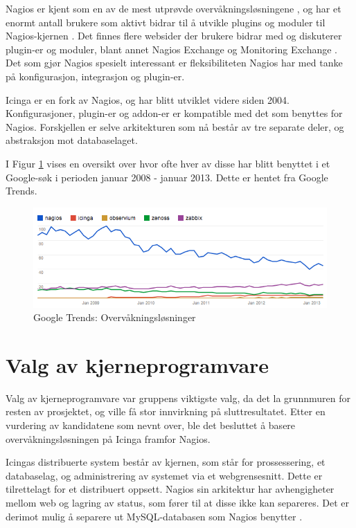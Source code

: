 Nagios er kjent som en av de mest utprøvde overvåkningsløsningene \cite{wiki:nagios} \cite{monitoringsetup} \cite{opensourcewatch} \cite{sectools}, og har et enormt antall brukere som aktivt bidrar til å utvikle plugins og moduler til Nagios-kjernen \cite{nagioscommunity}. Det finnes flere websider der brukere bidrar med og diskuterer plugin-er og moduler, blant annet Nagios Exchange \cite{nagiosexchange} og Monitoring Exchange \cite{monitoringexchange}. Det som gjør Nagios spesielt interessant er fleksibiliteten Nagios har med tanke på konfigurasjon, integrasjon og plugin-er.

Icinga er en fork av Nagios, og har blitt utviklet videre siden 2004. Konfigurasjoner, plugin-er og addon-er er kompatible med det som benyttes for Nagios. Forskjellen er selve arkitekturen som nå består av tre separate deler, og abstraksjon mot databaselaget. 

I Figur \ref{losninger} vises en oversikt over hvor ofte hver av disse har blitt benyttet i et Google-søk i perioden januar 2008 - januar 2013. Dette er hentet fra Google Trends.

\begin{figure}[H]
    \centering
    \includegraphics[scale=0.6]{img/monitoring_google_trends}
    \caption{Google Trends: Overvåkningsløsninger}
    \label{losninger}
\end{figure}

\section{Valg av kjerneprogramvare}
Valg av kjerneprogramvare var gruppens viktigste valg, da det la grunnmuren for resten av prosjektet, og ville få stor innvirkning på sluttresultatet. Etter en vurdering av kandidatene som nevnt over, ble det besluttet å basere overvåkningsløsningen på Icinga framfor Nagios.

Icingas distribuerte system består av kjernen, som står for prossessering, et databaselag, og administrering av systemet via et webgrensesnitt. Dette er tilrettelagt for et distribuert oppsett. Nagios sin arkitektur har avhengigheter mellom web og lagring av status, som fører til at disse ikke kan separeres. Det er derimot mulig å separere ut MySQL-databasen som Nagios benytter \cite{icingaarchitecture}.

